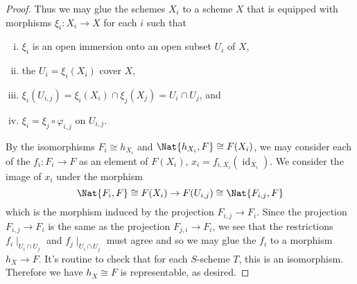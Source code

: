 \documentclass[10pt]{amsart}
\begin{document}
\begin{thm}
\begin{proof}
    Thus we may glue the schemes $X_i$ to a scheme $X$ that is equipped with morphisms $\xi_i: X_i \rightarrow X$ for each $i$ such that
    \begin{enumerate}[(i)]
    \item
      $\xi_i$ is an open immersion onto an open subset $U_i$ of $X$, 
    \item
      the $U_i = \xi_i(X_i)$ cover $X$,
    \item
      $\xi_i(U_{i,j}) = \xi_i(X_i) \cap \xi_j(X_j) = U_i \cap U_j$, and
    \item
      $\xi_i = \xi_j \circ \varphi_{i,j}$ on $U_{i,j}$.
    \end{enumerate}

    By the isomorphisms $F_i \cong h_{X_i}$ and  $\Nat{h_{X_i}, F} \cong F(X_i)$, we may consider each of the $f_i : F_i \rightarrow F$ as an element of $F(X_i)$, $x_i = f_{i,X_i}(\operatorname{id}_{X_i})$.
    We consider the image of $x_i$ under the morphism
    $$\Nat{F_i, F} \cong F(X_i) \rightarrow F(U_{i,j}) \cong \Nat{F_{i,j}, F}$$
    which is the morphism induced by the projection $F_{i,j} \rightarrow F_{i}$. 
    Since the projection $F_{i,j} \rightarrow F_i$ is the same as the projection $F_{j,i} \rightarrow F_i$, we see that the restrictions $f_i \mid_{U_i \cap U_j}$ and $f_j \mid_{U_i \cap U_j}$ must agree and so we may glue the $f_i$ to a morphism $h_X \rightarrow F$.  It's routine to check that for each $S$-scheme $T$, this is an isomorphism.
    Therefore we have $h_X \cong F$ is representable, as desired.
  \end{proof}
\end{thm}
\end{document}
